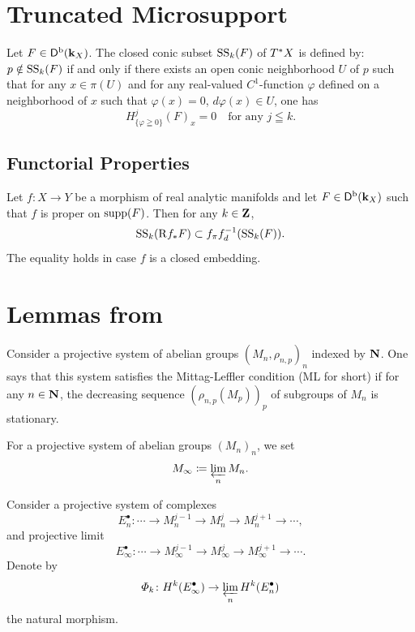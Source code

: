 \section{Truncated Microsupport}

\begin{Definition+}
  Let \(F\in\Dompb(\kk_X)\). 
  The closed conic subset \(\muS[k](F)\) of \(\cotb[X]\) 
  is defined by: \(p\notin \muS[k](F)\) 
  if and only if 
  there exists an open conic neighborhood \(U\) of \(p\) 
  such that for any \(x\in \pi(U)\) and 
  for any real-valued \(C^{1}\)-function \(\varphi\) 
  defined on a neighborhood of \(x\) such that 
  \(\varphi(x)=0\), \(d\varphi(x)\in U\), 
  one has \begin{equation}
    H^{j}_{\{\varphi\geqq0\}}(F)_x=0
    \quad \text{for any \(j\leqq k\).}
  \end{equation}
\end{Definition+}

\subsection{Functorial Properties} 
\begin{Proposition+}
  Let \(f\colon X\to Y\) be a morphism of real analytic manifolds and let \(F\in\Dompb(\kk_X)\) such that \(f\) is proper on \(\supp(F)\). 
  Then for any \(k\in\zz\), 
  \begin{equation}\label{eq:t-push}
    \muS[k](\Rder{f_{\ast}}F)\subset
    \mpb[f]\mdiff[f]^{-1}(\muS[k](F)).
  \end{equation}
  The equality holds in case \(f\) is a closed embedding.
\end{Proposition+}

\section{Lemmas from {\cite{KS90}}}

Consider a projective system of abelian groups \(
  \left(M_n,\rho_{n,p}\right)_n
\) indexed by \(\nn\). 
One says that this system satisfies 
the Mittag-Leffler condition (ML for short) 
if for any \(n\in\nn\), the decreasing sequence \(
  (\rho_{n,p}(M_p))_p
\) of subgroups of \(M_n\) is stationary.

For a projective system of abelian groups \((M_{n})_n\), 
we set \[
  M_{\infty}\coloneqq \prolim[n]M_n.
\]

Consider a projective system of complexes
\begin{equation}
  E_n^{\bullet}\colon 
  \cdots\to M_{n}^{j-1}\to M_{n}^{j}\to M_{n}^{j+1}\to\cdots,
\end{equation}
and projective limit
\begin{equation}
  E_{\infty}^{\bullet}\colon 
  \cdots
  \to M_{\infty}^{j-1}
  \to M_{\infty}^{j}
  \to M_{\infty}^{j+1}
  \to\cdots.
\end{equation}
Denote by 
\begin{equation}
  \varPhi_{k}\colon H^{k}(E_{\infty}^{\bullet})\to \prolim[n]H^{k}(E_{n}^{\bullet})
\end{equation}
the natural morphism.

